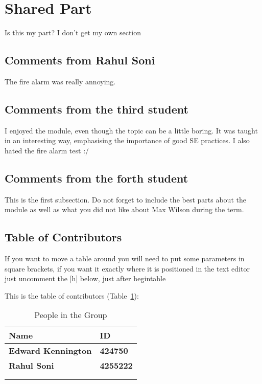 \section{Shared Part}

Is this my part? I don't get my own section



\subsection{Comments from Rahul Soni}
The fire alarm was really annoying.

\subsection{Comments from the third student}
I enjoyed the module, even though the topic can be a little boring. It was taught in an interesting way, emphasising the importance of good SE practices. I also hated the fire alarm test :/

\subsection{Comments from the forth student}
This is the first subsection. Do not forget to include the best parts about the module as well as what you did not like about Max Wilson during the term.

\subsection{Table of Contributors}


If you want to move a table around you will need to put some parameters in square brackets, if you want it exactly where it is positioned in the text editor just uncomment the [h] below, just after begin{table}

This is the table of contributors (Table~\ref{authors}):
\begin{table}%
\centering
\caption{People in the Group}
\label{authors}
\begin{tabular}{|l|l|}
\hline
\textbf{Name} & \textbf{ID} \\
\hline
\textbf{Edward Kennington}& \textbf{424750}\\
\hline
\textbf{Rahul Soni} & \textbf{4255222} \\
\hline
& \\
\hline
& \\
\hline
\end{tabular}
\end{table}